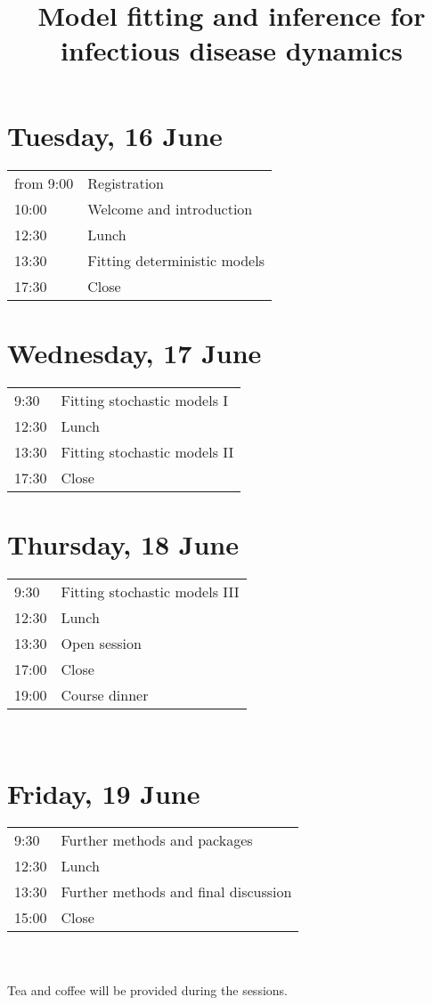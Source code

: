 \documentclass[a4paper]{article}
\title{Model fitting and inference for\\infectious disease dynamics}
\author{}
\date{}
\begin{document}
\maketitle

\section*{Tuesday, 16 June}
\label{sec:tuesday}

\begin{tabular}{R{1.5cm} l}
from 9:00 & Registration\\
10:00 & Welcome and introduction\\
12:30 & Lunch\\
13:30 & Fitting deterministic models\\
17:30 & Close\\
\end{tabular}

\section*{Wednesday, 17 June}
\label{sec:wednesday}
\begin{tabular}{R{1.5cm} l}
9:30 & Fitting stochastic models I\\
12:30 & Lunch\\
13:30 & Fitting stochastic models II\\
17:30 & Close\\
\end{tabular}

\section*{Thursday, 18 June}
\label{sec:thursday}
\begin{tabular}{R{1.5cm} l}
9:30 & Fitting stochastic models III\\
12:30 & Lunch\\
13:30 & Open session\\
17:00 & Close\\
19:00 & Course dinner
\end{tabular}\\

\section*{Friday, 19 June}
\label{sec:thursday}
\begin{tabular}{R{1.5cm} l}
9:30 & Further methods and packages\\
12:30 & Lunch\\
13:30 & Further methods and final discussion\\
15:00 & Close\\
\end{tabular}\\
\vspace{0.5cm}\\
Tea and coffee will be provided during the sessions.
\end{document}
